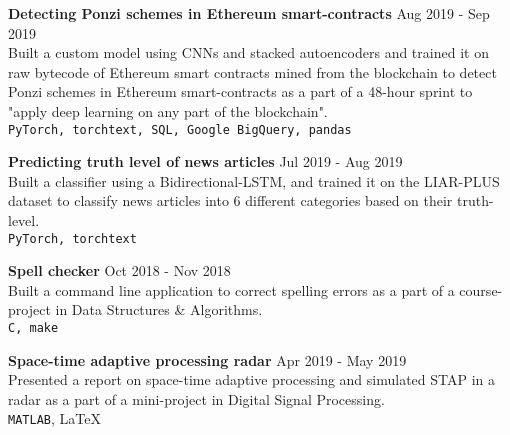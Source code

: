 \documentclass[letterpaper]{article}
\renewenvironment{itemize}{
  \begin{list}{}{
    \setlength{\leftmargin}{1.5em}
  }
}{
  \end{list}
}
\newcommand{\smallGreyFont}[1]{\textcolor{black!80}{\small{#1}}}
\begin{document}
\begin{itemize}
    \item
    \textbf{Detecting Ponzi schemes in Ethereum smart-contracts}
    \hfill{\smallGreyFont{Aug 2019 - Sep 2019}}\\
      Built a custom model using CNNs and stacked autoencoders and trained it on raw bytecode of Ethereum smart contracts mined from the blockchain to detect Ponzi schemes in Ethereum smart-contracts as a part of a 48-hour sprint to "apply deep learning on any part of the blockchain".\\
      \texttt{\smallGreyFont{PyTorch, torchtext, SQL, Google BigQuery, pandas}}

    \item
    \textbf{Predicting truth level of news articles}
    \hfill{\smallGreyFont{Jul 2019 - Aug 2019}}\\
      Built a classifier using a Bidirectional-LSTM, and trained it on the LIAR-PLUS dataset to classify news articles into 6 different categories based on their truth-level.\\
      \texttt{\smallGreyFont{PyTorch, torchtext}}

    \item
    \textbf{Spell checker}
    \hfill{\smallGreyFont{Oct 2018 - Nov 2018}}\\
      Built a command line application to correct spelling errors as a part of a course-project in Data Structures \& Algorithms.\\
      \texttt{\smallGreyFont{C, make}}

    \item
    \textbf{Space-time adaptive processing radar}
    \hfill{\smallGreyFont{Apr 2019 - May 2019}}\\
      Presented a report on space-time adaptive processing and simulated STAP in a radar as a part of a mini-project in Digital Signal Processing.\\
      \smallGreyFont{\texttt{MATLAB}, \LaTeX}

  \end{itemize}


\end{document}
